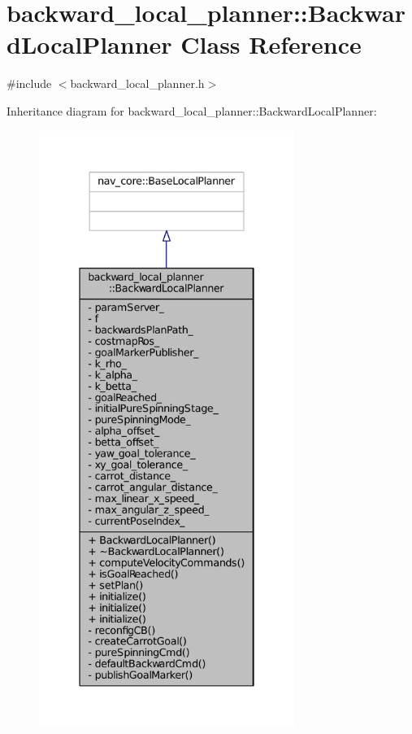 \hypertarget{classbackward__local__planner_1_1BackwardLocalPlanner}{}\section{backward\+\_\+local\+\_\+planner\+:\+:Backward\+Local\+Planner Class Reference}
\label{classbackward__local__planner_1_1BackwardLocalPlanner}


{\ttfamily \#include $<$backward\+\_\+local\+\_\+planner.\+h$>$}



Inheritance diagram for backward\+\_\+local\+\_\+planner\+:\+:Backward\+Local\+Planner\+:
\nopagebreak
\begin{figure}[H]
\begin{center}
\leavevmode
\includegraphics[height=550pt]{classbackward__local__planner_1_1BackwardLocalPlanner__inherit__graph}
\end{center}
\end{figure}


